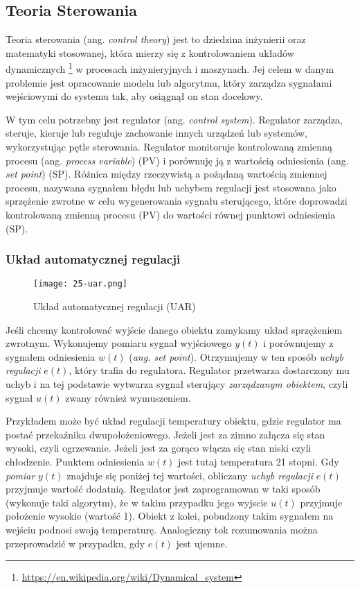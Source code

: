 \subsection{Teoria Sterowania}

Teoria sterowania (ang. \textit{control theory}) jest to dziedzina inżynierii oraz matematyki stosowanej, która mierzy się z kontrolowaniem układów dynamicznych \footnote{\url{https://en.wikipedia.org/wiki/Dynamical_system}} w procesach inżynieryjnych i maszynach. Jej celem w danym problemie jest opracowanie modelu lub algorytmu, który zarządza sygnałami wejściowymi do systemu tak, aby osiągnął on stan docelowy. 

W tym celu potrzebny jest regulator (ang. \textit{control system}). Regulator zarządza, steruje, kieruje lub reguluje zachowanie innych urządzeń lub systemów, wykorzystując pętle sterowania. Regulator monitoruje kontrolowaną zmienną procesu (ang. \textit{process variable}) (PV) i porównuję ją z wartością odniesienia (ang. \textit{set point}) (SP). Różnica między rzeczywistą a pożądaną wartością zmiennej procesu, nazywana sygnałem błędu lub uchybem regulacji jest stosowana jako sprzężenie zwrotne w celu wygenerowania sygnału sterującego, które doprowadzi kontrolowaną zmienną procesu (PV) do wartości równej punktowi odniesienia (SP).

\subsubsection{Układ automatycznej regulacji}
\begin{figure}[!h]
    \centering \texttt{[image: 25-uar.png]}
    \caption{Układ automatycznej regulacji (UAR)}\label{fig:25-uar}
\end{figure}

Jeśli chcemy kontrolować wyjście danego obiektu zamykamy układ sprzężeniem zwrotnym. Wykonujemy pomiaru sygnał wyjściowego $y(t)$  i porównujemy z sygnałem odniesienia $w(t)$ (\textit{ang. set point}). Otrzymujemy w ten sposób \textit{uchyb regulacji} $e(t)$, który trafia do regulatora. Regulator przetwarza dostarczony mu uchyb i na tej podstawie wytwarza sygnał sterujący \textit{zarządzanym obiektem}, czyli sygnał $u(t)$ zwany również wymuszeniem.

Przykładem może być układ regulacji temperatury obiektu, gdzie regulator ma postać przekaźnika dwupołożeniowego. Jeżeli jest za zimno załącza się stan wysoki, czyli ogrzewanie. Jeżeli jest za gorąco włącza się stan niski czyli chłodzenie. Punktem odniesienia $w(t)$ jest tutaj temperatura 21 stopni. Gdy \textit{pomiar} $y(t)$ znajduje się poniżej tej wartości, obliczany \textit{uchyb regulacji} $e(t)$ przyjmuje wartość dodatnią. Regulator jest zaprogramowan w taki sposób (wykonuje taki algorytm), że w takim przypadku jego wyjscie $u(t)$ przyjmuje położenie wysokie (wartość 1). Obiekt z kolei, pobudzony takim sygnałem na wejściu podnosi swoją temperaturę. Analogiczny tok rozumowania można przeprowadzić w przypadku, gdy $e(t)$ jest ujemne. 

